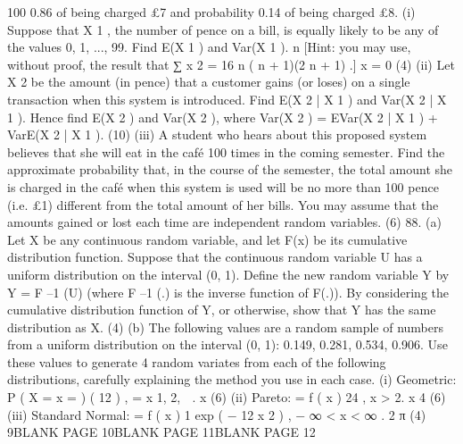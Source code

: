 100
0.86 of being charged £7 and probability 0.14 of being charged £8.
(i)
Suppose that X 1 , the number of pence on a bill, is equally likely to be any of
the values 0, 1, ..., 99. Find E(X 1 ) and Var(X 1 ).
n
[Hint: you may use, without proof, the result that
∑ x 2 = 16 n ( n + 1)(2 n + 1) .]
x = 0
(4)
(ii)
Let X 2 be the amount (in pence) that a customer gains (or loses) on a single
transaction when this system is introduced. Find E(X 2 | X 1 ) and Var(X 2 | X 1 ).
Hence find E(X 2 ) and Var(X 2 ), where
Var(X 2 ) = E{Var(X 2 | X 1 )} + Var{E(X 2 | X 1 )}.
(10)
(iii)
A student who hears about this proposed system believes that she will eat in the
café 100 times in the coming semester. Find the approximate probability that,
in the course of the semester, the total amount she is charged in the café when
this system is used will be no more than 100 pence (i.e. £1) different from the
total amount of her bills. You may assume that the amounts gained or lost each
time are independent random variables.
(6)
88.
(a) Let X be any continuous random variable, and let F(x) be its cumulative
distribution function. Suppose that the continuous random variable U has a
uniform distribution on the interval (0, 1). Define the new random variable Y
by Y = F –1 (U) (where F –1 (.) is the inverse function of F(.)). By considering the
cumulative distribution function of Y, or otherwise, show that Y has the same
distribution as X.
(4)
(b) The following values are a random sample of numbers from a uniform
distribution on the interval (0, 1):
0.149,
0.281,
0.534,
0.906.
Use these values to generate 4 random variates from each of the following
distributions, carefully explaining the method you use in each case.
(i)
Geometric:
P ( X = x =
) ( 12 ) , =
x 1, 2,  .
x
(6)
(ii)
Pareto:
=
f ( x )
24
, x > 2.
x 4
(6)
(iii)
Standard Normal: =
f ( x )
1
exp ( − 12 x 2 ) , − ∞ < x < ∞ .
2 π
(4)
9BLANK PAGE
10BLANK PAGE
11BLANK PAGE
12
